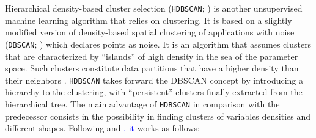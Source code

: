 \documentclass[fleqn,usenatbib]{mnras}
\newcommand{\rlopes}[1]{\textcolor{blue}{#1}}
\begin{document}
Hierarchical density-based cluster selection (\texttt{HDBSCAN}; \citealp{Campello:2013})
is another unsupervised machine learning algorithm that relies on clustering. It is based on a slightly
modified version of density-based spatial
clustering of applications \sout{with noise} (\texttt{DBSCAN}; \citealp{Ester:1996}) which
declares points as noise. It is an algorithm that assumes clusters that are characterized
by ``islands'' of high density in the sea of the parameter space. Such clusters constitute
data partitions that have a higher density
than their neighbors  \citep{Ntwaetsile:2021}. \texttt{HDBSCAN} takes forward the
DBSCAN concept by introducing a hierarchy to the clustering, with ``persistent''
clusters finally extracted from the hierarchical tree. The main advantage of
\texttt{HDBSCAN} in comparison with the predecessor consists in the possibility in finding
clusters of variables densities and different shapes. Following \citet{Malzer:2021}
and \citet{Ntwaetsile:2021}\rlopes{, it} works as follows:
\end{document}
